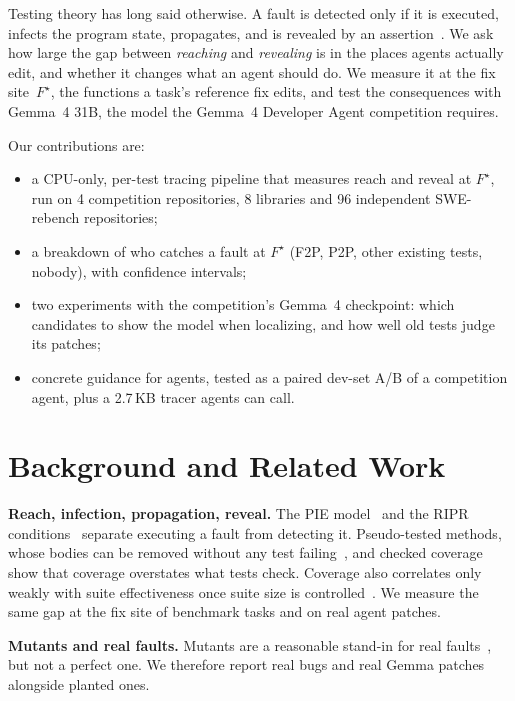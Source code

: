 \documentclass[conference]{IEEEtran}
\newcommand{\Fs}{F^{\star}}
\begin{document}
Testing theory has long said otherwise. A fault is detected only if it is executed, infects the program state, propagates, and is revealed by an assertion~\cite{voas1992pie,ammann2016intro}. We ask how large the gap between \emph{reaching} and \emph{revealing} is in the places agents actually edit, and whether it changes what an agent should do. We measure it at the fix site~$\Fs$, the functions a task's reference fix edits, and test the consequences with Gemma~4 31B, the model the Gemma~4 Developer Agent competition requires.

Our contributions are:
\begin{itemize}
\item a CPU-only, per-test tracing pipeline that measures reach and reveal at $\Fs$, run on 4 competition repositories, 8 libraries and 96 independent SWE-rebench repositories;
\item a breakdown of who catches a fault at $\Fs$ (F2P, P2P, other existing tests, nobody), with confidence intervals;
\item two experiments with the competition's Gemma~4 checkpoint: which candidates to show the model when localizing, and how well old tests judge its patches;
\item concrete guidance for agents, tested as a paired dev-set A/B of a competition agent, plus a 2.7\,KB tracer agents can call.
\end{itemize}

\section{Background and Related Work}
\textbf{Reach, infection, propagation, reveal.} The PIE model~\cite{voas1992pie} and the RIPR conditions~\cite{ammann2016intro} separate executing a fault from detecting it. Pseudo-tested methods, whose bodies can be removed without any test failing~\cite{niedermayr2016will,vera2018descartes}, and checked coverage~\cite{schuler2011checked} show that coverage overstates what tests check. Coverage also correlates only weakly with suite effectiveness once suite size is controlled~\cite{inozemtseva2014coverage}. We measure the same gap at the fix site of benchmark tasks and on real agent patches.

\textbf{Mutants and real faults.} Mutants are a reasonable stand-in for real faults~\cite{just2014mutants,papadakis2018mutation}, but not a perfect one. We therefore report real bugs and real Gemma patches alongside planted ones.
\end{document}
